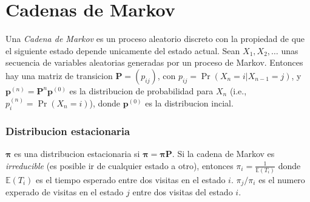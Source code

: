 %
%
%

\section{Cadenas de Markov}
Una \emph{Cadena de Markov} es un proceso aleatorio discreto con la propiedad de que el siguiente estado depende unicamente del estado actual.
Sean $X_1,X_2,\ldots$ unas secuencia de variables aleatorias generadas por un proceso de Markov.
Entonces hay una matriz de transicion $\mathbf{P} = (p_{ij})$, con $p_{ij} = \Pr(X_n = i | X_{n-1} = j)$,
y $\mathbf{p}^{(n)} = \mathbf P^n \mathbf p^{(0)}$ es la  distribucion de probabilidad para  $X_n$ (i.e., $p^{(n)}_i = \Pr(X_n = i)$),
donde $\mathbf{p}^{(0)}$ es la distribucion incial.

\subsubsection{Distribucion estacionaria}
$\mathbf{\pi}$ es una distribucion estacionaria si $\mathbf{\pi} = \mathbf{\pi P}$.
Si la cadena de Markov es \emph{irreducible} (es posible ir de cualquier estado a otro),
entonces $\pi_i = \frac{1}{\mathbb{E}(T_i)}$ donde $\mathbb{E}(T_i)$  es el tiempo esperado entre dos visitas en el estado $i$.
$\pi_j/\pi_i$ es el numero experado de visitas en el estado $j$ entre dos visitas del estado $i$.

